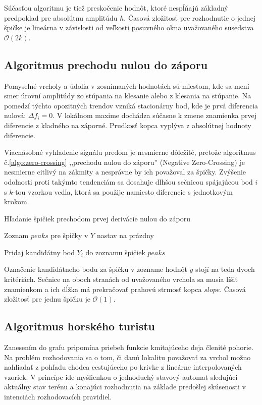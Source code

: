 Súčasťou algoritmu je tiež preskočenie hodnôt, ktoré nespĺňajú základný predpoklad pre absolútnu amplitúdu $h$.
Časová zložitosť pre rozhodnutie o jednej špičke je lineárna v závislosti od veľkosti posuvného okna uvažovaného
susedstva $\mathcal{O}(2k)$.

\subsection{Algoritmus prechodu nulou do záporu}
Pomyselné vrcholy a údolia v zosnímaných hodnotách sú miestom, kde sa mení smer úrovní amplitúdy zo stúpania na klesanie alebo
z klesania na stúpanie. Na pomedzí týchto opozitných trendov vzniká stacionárny bod, kde je prvá diferencia nulová:
$\Delta f_i = 0$. V lokálnom maxime dochádza súčasne k zmene znamienka prvej diferencie z kladného na záporné. Prudkosť
kopca vyplýva z absolútnej hodnoty diferencie.

Viacnásobné vyhladenie signálu predom je nesmierne dôležité,
pretože algoritmus č.\ref{algo:zero-crossing} ,,prechodu nulou do záporu'' (Negative Zero-Crossing) je nesmierne citlivý
na zákmity a nesprávne by ich považoval za špičky. Zvýšenie odolnosti proti takýmto tendenciám sa dosahuje dlhšou sečnicou
spájajúcou bod $i$ s $k$-tou vzorkou vedľa, ktorá sa použije namiesto diferencie s jednotkovým krokom.

\begin{algorithm}[h]
\caption{Hľadanie špičiek prechodom prvej derivácie nulou do záporu}
\begin{algorithmic}[1]
\State Zoznam $peaks$ pre špičky v $Y$ nastav na prázdny

	    	\State Pridaj kandidátny bod $Y_i$ do zoznamu špičiek $peaks$
		\EndIf
	\EndIf
\EndFor
\end{algorithmic}
\label{algo:zero-crossing}
\end{algorithm}

Označenie kandidátneho bodu za špičku v zozname hodnôt $y$ stojí na teda dvoch kritériách. Sečnice na oboch stranách od uvažovaného
vrchola sa musia líšiť znamienkom a ich dĺžka má prekračovať prahovú strmosť kopca $slope$. Časová zložitosť pre jednu špičku je
$\mathcal{O}(1)$.

\subsection{Algoritmus horského turistu}
Zanesením do grafu pripomína priebeh funkcie kmitajúceho deja členité pohorie. Na problém rozhodovania sa o tom, či danú lokalitu
považovať za vrchol možno nahliadať z pohľadu chodca cestujúceho po krivke z lineárne interpolovaných vzoriek. V princípe
ide myšlienkou o jednoduchý stavový automat sledujúci aktuálny stav terénu a konajúci rozhodnutia na základe predošlej
skúsenosti v intenciách rozhodovacích pravidiel.

